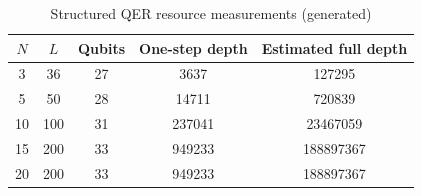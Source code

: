 \begin{table}[h]
\small
\centering
\caption{Structured QER resource measurements (generated)}
\label{tab:runtime}
\begin{tabular}{ccccc}
\hline
$N$&$L$&Qubits&One-step depth&Estimated full depth\\
\hline
3&36&27&3637&127295\\
5&50&28&14711&720839\\
10&100&31&237041&23467059\\
15&200&33&949233&188897367\\
20&200&33&949233&188897367\\
\hline
\end{tabular}
\end{table}
